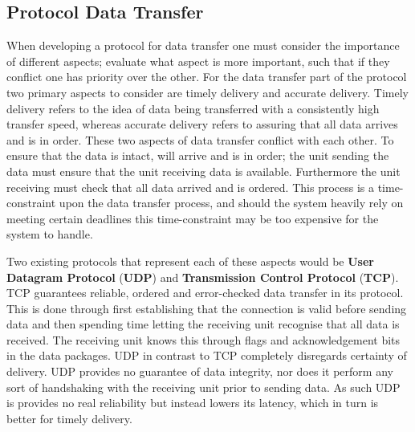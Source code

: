 \subsection{Protocol Data Transfer} %
When developing a protocol for data transfer one must consider the importance of different aspects; evaluate what aspect is more important, such that if they conflict one has priority over the other.
For the data transfer part of the protocol two primary aspects to consider are timely delivery and accurate delivery.
Timely delivery refers to the idea of data being transferred with a consistently high transfer speed, whereas accurate delivery refers to assuring that all data arrives and is in order.
These two aspects of data transfer conflict with each other.
To ensure that the data is intact, will arrive and is in order; the unit sending the data must ensure that the unit receiving data is available. 
Furthermore the unit receiving must check that all data arrived and is ordered.
This process is a time-constraint upon the data transfer process, and should the system heavily rely on meeting certain deadlines this time-constraint may be too expensive for the system to handle.

Two existing protocols that represent each of these aspects would be \textbf{User Datagram Protocol} (\textbf{UDP}) and \textbf{Transmission Control Protocol} (\textbf{TCP}).
TCP guarantees reliable, ordered and error-checked data transfer in its protocol.
This is done through first establishing that the connection is valid before sending data and then spending time letting the receiving unit recognise that all data is received.
The receiving unit knows this through flags and acknowledgement bits in the data packages.
UDP in contrast to TCP completely disregards certainty of delivery.
UDP provides no guarantee of data integrity, nor does it perform any sort of handshaking with the receiving unit prior to sending data.
As such UDP is provides no real reliability but instead lowers its latency, which in turn is better for timely delivery.